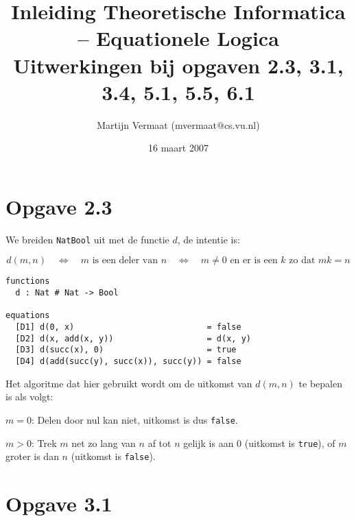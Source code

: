 \documentclass[a4paper,11pt]{article}
\title{Inleiding Theoretische Informatica -- Equationele Logica\\
\normalsize{Uitwerkingen bij opgaven 2.3, 3.1, 3.4, 5.1, 5.5, 6.1}}
\author{Martijn Vermaat (mvermaat@cs.vu.nl)}
\date{16 maart 2007}
\begin{document}
\maketitle


\section*{Opgave 2.3}

We breiden \verb|NatBool| uit met de functie $d$, de intentie is:

\begin{displaymath}
d(m, n) \quad \Longleftrightarrow \quad \mbox{$m$ is een deler van $n$} \quad \Longleftrightarrow \quad \mbox{$m \neq 0$ en er is een $k$ zo dat $m k
= n$}
\end{displaymath}

\begin{verbatim}
functions
  d : Nat # Nat -> Bool

equations
  [D1] d(0, x)                           = false
  [D2] d(x, add(x, y))                   = d(x, y)
  [D3] d(succ(x), 0)                     = true
  [D4] d(add(succ(y), succ(x)), succ(y)) = false
\end{verbatim}

Het algoritme dat hier gebruikt wordt om de uitkomst van $d(m, n)$ te
bepalen is als volgt:

\begin{description}

\item{$m=0$:}
Delen door nul kan niet, uitkomst is dus \verb|false|.

\item{$m>0$:}
Trek $m$ net zo lang van $n$ af tot $n$ gelijk is aan $0$ (uitkomst is
\verb|true|), of $m$ groter is dan $n$ (uitkomst is \verb|false|).

\end{description}


\section*{Opgave 3.1}
\end{document}
